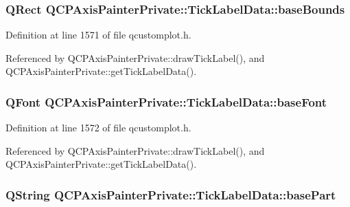 \subsubsection[{base\+Bounds}]{\setlength{\rightskip}{0pt plus 5cm}Q\+Rect Q\+C\+P\+Axis\+Painter\+Private\+::\+Tick\+Label\+Data\+::base\+Bounds}\label{struct_q_c_p_axis_painter_private_1_1_tick_label_data_aac1047ae6ab8e9f5a42923082aabfff5}


Definition at line 1571 of file qcustomplot.\+h.



Referenced by Q\+C\+P\+Axis\+Painter\+Private\+::draw\+Tick\+Label(), and Q\+C\+P\+Axis\+Painter\+Private\+::get\+Tick\+Label\+Data().

\hypertarget{struct_q_c_p_axis_painter_private_1_1_tick_label_data_a0d4958a706debaa8d19a9b65fc090d56}{}
\subsubsection[{base\+Font}]{\setlength{\rightskip}{0pt plus 5cm}Q\+Font Q\+C\+P\+Axis\+Painter\+Private\+::\+Tick\+Label\+Data\+::base\+Font}\label{struct_q_c_p_axis_painter_private_1_1_tick_label_data_a0d4958a706debaa8d19a9b65fc090d56}


Definition at line 1572 of file qcustomplot.\+h.



Referenced by Q\+C\+P\+Axis\+Painter\+Private\+::draw\+Tick\+Label(), and Q\+C\+P\+Axis\+Painter\+Private\+::get\+Tick\+Label\+Data().

\hypertarget{struct_q_c_p_axis_painter_private_1_1_tick_label_data_ad65b76a5cafc412179a20b5d79809fc4}{}
\subsubsection[{base\+Part}]{\setlength{\rightskip}{0pt plus 5cm}Q\+String Q\+C\+P\+Axis\+Painter\+Private\+::\+Tick\+Label\+Data\+::base\+Part}\label{struct_q_c_p_axis_painter_private_1_1_tick_label_data_ad65b76a5cafc412179a20b5d79809fc4}


